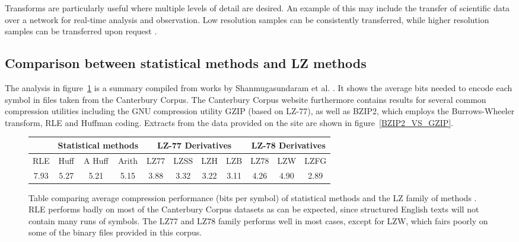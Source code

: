 Transforms are particularly useful where multiple levels of detail are desired. An example of this may include the transfer of scientific data over a network 
for real-time analysis and observation. Low resolution samples can be consistently transferred, while higher resolution samples can be transferred upon request \cite{Tao:1994:PTS:951087.951108}.
\subsection{Comparison between statistical methods and LZ methods}
The analysis in figure~\ref{STATISTICAL_VS_LZ} is a summary compiled from works by Shanmugasundaram et al. \cite{shanmugasundaram2011comparative}. It shows the average bits 
needed to encode each symbol in files taken from the Canterbury Corpus. The Canterbury Corpus website furthermore contains results for several common compression utilities 
including the GNU compression utility GZIP (based on LZ-77), as well as BZIP2, which employs the Burrows-Wheeler transform, RLE and Huffman coding. Extracts from the data 
provided on the site are shown in figure~\ref{BZIP2_VS_GZIP}.
\begin{figure}[h!]
\begin{mdframed}
\centering
\begin{tabular}{|c|c|c|c|c|c|c|c|c|c|c|}
 \hline
 & \multicolumn{3}{|c|}{Statistical methods} & \multicolumn{4}{|c|}{LZ-77 Derivatives} & \multicolumn{3}{|c|}{LZ-78 Derivatives} \\
 \hline
 RLE & Huff & A Huff & Arith & LZ77 & LZSS & LZH & LZB & LZ78 & LZW & LZFG \\
 \hline
 7.93 & 5.27 & 5.21 & 5.15 & 3.88 & 3.32 & 3.22 & 3.11 & 4.26 & 4.90 & 2.89 \\
 \hline
\end{tabular}
\caption[Bits per symbol comparison between statistical and LZ methods]{Table comparing average compression performance (bits per symbol) of statistical methods and the LZ family of methods \cite{shanmugasundaram2011comparative}. RLE performs
 badly on most of the Canterbury Corpus datasets as can be expected, since structured English texts will not contain many runs of symbols. The LZ77 and LZ78 family performs well in most cases,
 except for LZW, which fairs poorly on some of the binary files provided in this corpus.}
 \label{STATISTICAL_VS_LZ}
\end{mdframed}
\end{figure}
